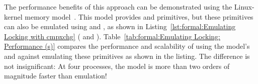 The performance benefits of this approach can be demonstrated using
the Linux-kernel memory
model~\cite{JadeAlglave2017LWN-LKMM-1,JadeAlglave2017LWN-LKMM-2}.
This model provides  and 
primitives, but these primitives can also be emulated using
 and , as shown in
Listing~\ref{lst:formal:Emulating Locking with cmpxchg}
( and ).
Table~\ref{tab:formal:Emulating Locking: Performance (s)}
compares the performance and scalability of using the model's
 and  against emulating these
primitives as shown in the listing.
The difference is not insignificant: At four processes, the model
is more than two orders of magnitude faster than emulation!

